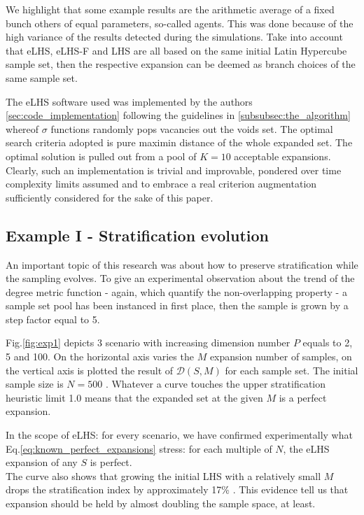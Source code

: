 \documentclass[12pt]{extarticle}
\newcommand{\meqref}[1]{Eq.\ref{#1}}
\newcommand{\mfigref}[1]{Fig.\ref{#1}}
\begin{document}
We highlight that some example results are the arithmetic average of a fixed bunch others of equal parameters, so-called agents. This was done because of the high variance of the results detected during the simulations. Take into account that eLHS, eLHS-F and LHS are all based on the same initial Latin Hypercube sample set, then the respective expansion can be deemed as branch choices of the same sample set.

The eLHS software used was implemented by the authors \cref{sec:code_implementation} following the guidelines in \cref{subsubsec:the_algorithm} whereof $\sigma$ functions randomly pops vacancies out the voids set. The optimal search criteria adopted is pure maximin distance of the whole expanded set. The optimal solution is pulled out from a pool of $K = 10$ acceptable expansions. Clearly, such an implementation is trivial and improvable, pondered over time complexity limits assumed and to embrace a real criterion augmentation sufficiently considered for the sake of this paper.

\pagebreak
\subsection{Example I - Stratification evolution}
\label{subsec:exp1}
An important topic of this research was about how to preserve stratification while the sampling evolves. To give an experimental observation about the trend of the degree metric function - again, which quantify the non-overlapping property - a sample set pool has been instanced in first place, then the sample is grown by a step factor equal to 5. 

\mfigref{fig:exp1} depicts 3 scenario with increasing dimension number $P$ equals to 2, 5 and 100. On the horizontal axis varies the $M$ expansion number of samples, on the vertical axis is plotted the result of $\mathcal{D}(S, M)$ for each sample set. The initial sample size is $N = 500$ . Whatever a curve touches the upper stratification heuristic limit 1.0 means that the expanded set at the given $M$ is a perfect expansion.

In the scope of eLHS: for every scenario, we have confirmed experimentally what \meqref{eq:known_perfect_expansions} stress: for each multiple of $N$, the eLHS expansion of any $S$ is perfect. \\
The curve also shows that growing the initial LHS with a relatively small $M$ drops the stratification index by approximately 17\% . This evidence tell us that expansion should be held by almost doubling the sample space, at least.
\end{document}
